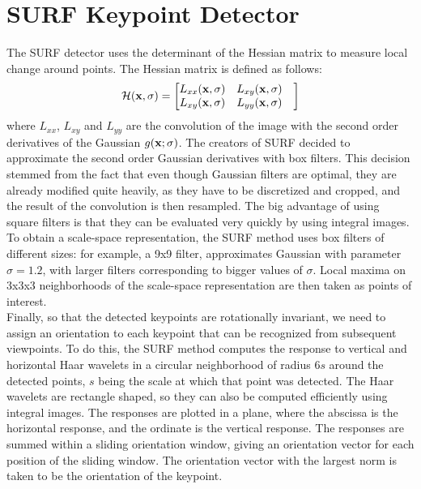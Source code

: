 \section{SURF Keypoint Detector}
The SURF detector uses the determinant of the Hessian matrix to measure local change around points. The Hessian matrix is defined as follows:
\begin{equation}
  \mathcal{H}(\bf{x},\sigma) =  \begin{bmatrix}
  L_{xx}(\bf{x},\sigma) & L_{xy}(\bf{x},\sigma) &\\
  L_{xy}(\bf{x},\sigma) & L_{yy}(\bf{x},\sigma)
\end{bmatrix}
\end{equation}
where $L_{xx}$, $L_{xy}$ and $L_{yy}$ are the convolution of the image with the second order derivatives of the Gaussian $g(\bf{x};\sigma)$. The creators of SURF decided to approximate the second order Gaussian derivatives with box filters. This decision stemmed from the fact that even though Gaussian filters are optimal, they are already modified quite heavily, as they have to be discretized and cropped, and the result of the convolution is then resampled. The big advantage of using square filters is that they can be evaluated very quickly by using integral images. To obtain a scale-space representation, the SURF method uses box filters of different sizes: for example, a 9x9 filter, approximates Gaussian with parameter $\sigma = 1.2$, with larger filters corresponding to bigger values of $\sigma$. Local maxima on 3x3x3 neighborhoods of the scale-space representation are then taken as points of interest.\\
Finally, so that the detected keypoints are rotationally invariant, we need to assign an orientation to each keypoint that can be recognized from subsequent viewpoints. To do this, the SURF method computes the response to vertical and horizontal Haar wavelets in a circular neighborhood of radius $6s$ around the detected points, $s$ being the scale at which that point was detected. The Haar wavelets are rectangle shaped, so they can also be computed efficiently using integral images. The responses are plotted in a plane, where the abscissa is the horizontal response, and the ordinate is the vertical response. The responses are summed within a sliding orientation window, giving an orientation vector for each position of the sliding window. The orientation vector with the largest norm is taken to be the orientation of the keypoint.
\cite{surf}

